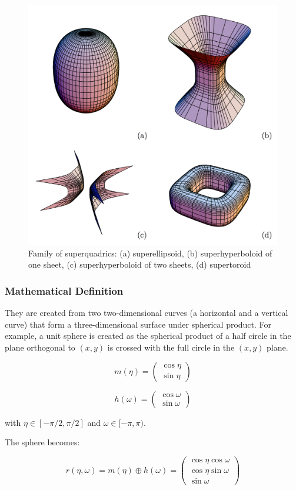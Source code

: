 \documentclass{article}
\begin{document}
\begin{figure}
\centering
\includegraphics[width=0.5\columnwidth]{figures/superquadric_family}
\caption{Family of superquadrics: (a) superellipsoid, (b) superhyperboloid of one sheet, (c) superhyperboloid of two sheets, (d) supertoroid}
\label{fig:superquadric_family}
\end{figure}

\subsubsection*{Mathematical Definition}
\label{sec:math}
They are created from two two-dimensional curves (a horizontal and a vertical curve) that form a three-dimensional surface under spherical product. For example, a unit sphere is created as the spherical product of a half circle in the plane orthogonal to $(x, y)$ is crossed with the full circle in the $(x, y)$ plane.

\begin{equation}
m (\eta) = \begin{pmatrix} \cos {\eta} \\ \sin{\eta} \end{pmatrix}
\end{equation}

\begin{equation}
h(\omega) = \begin{pmatrix} \cos {\omega} \\ \sin {\omega} \end{pmatrix}
\end{equation}

with $\eta \in [-\pi/2, \pi/2]$ and $\omega \in [-\pi, \pi)$.

The sphere becomes:

\begin{equation}
r (\eta, \omega) = m (\eta) \oplus h (\omega) = \begin{pmatrix} \cos{\eta} \cos{\omega} \\ \cos{\eta} \sin{\omega} \\ \sin{\omega} \end{pmatrix}
\end{equation}
\end{document}
